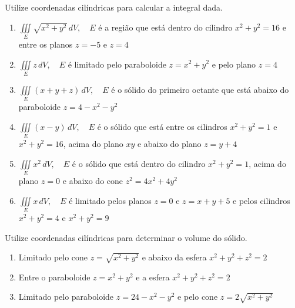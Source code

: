 \documentclass[a4paper, 12pt]{article}
\begin{document}
	
	
	\vspace{5mm}
	
	Utilize coordenadas cilíndricas para calcular a integral dada.
	
	\begin{enumerate}
		
		\item $\displaystyle \iiint \limits_{E} \sqrt{x^2 + y^2} \, dV, \quad E$ é a região que está dentro do cilindro $x^2 + y^2 = 16$ e entre os planos $z = -5$ e $z = 4$
		\resposta{$384\pi$}
		
		\item $\displaystyle \iiint \limits_{E} z \, dV, \quad E$ é limitado pelo paraboloide $z = x^2 + y^2$ e pelo plano $z = 4$
		
		\item $\displaystyle \iiint \limits_{E} (x + y + z) \, dV, \quad E$ é o sólido do primeiro octante que está abaixo do paraboloide $z = 4 - x^2 - y^2$
		
		\item $\displaystyle \iiint \limits_{E} (x - y) \, dV, \quad E$ é o sólido que está entre os cilindros $x^2 + y^2 = 1$ e $x^2 + y^2 = 16$, acima do plano $xy$ e abaixo do plano $z = y + 4$
		
		\item $\displaystyle \iiint \limits_{E} x^2 \, dV, \quad E$ é o sólido que está dentro do cilindro $x^2 + y^2 = 1$, acima do plano $z = 0$ e abaixo do cone $z^2 = 4x^2 + 4y^2$
		
		\item $\displaystyle \iiint \limits_{E} x \, dV, \quad E$ é limitado pelos planos $z = 0$ e $z = x + y + 5$ e pelos cilindros $x^2 + y^2 = 4$ e $x^2 + y^2 = 9$
	
	\end{enumerate}
	
	\vspace{5mm}
	
	Utilize coordenadas cilíndricas para determinar o volume do sólido.	
	
	\begin{enumerate}[resume]
	
		\item Limitado pelo cone $z = \sqrt{x^2 + y^2}$ e abaixo da esfera $x^2 + y^2 + z^2 = 2$
		
		\item Entre o paraboloide $z = x^2 + y^2$ e a esfera $x^2 + y^2 + z^2 = 2$
		
		\item Limitado pelo paraboloide $z = 24 - x^2 - y^2$ e pelo cone $z = 2\sqrt{x^2 + y^2}$
		
	\end{enumerate}
		
	\vspace{5mm}	
	
\end{document}
